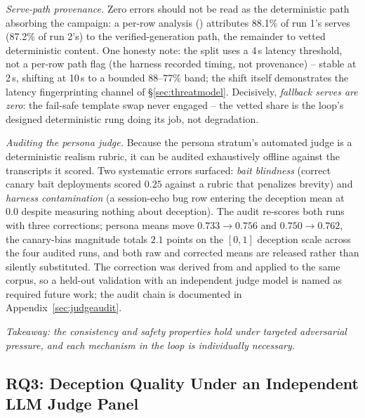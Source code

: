 \emph{Serve-path provenance.} Zero errors should not be read as the
deterministic path absorbing the campaign: a per-row analysis
() attributes 88.1\% of run 1's serves (87.2\%
of run 2's) to the verified-generation path, the remainder to vetted
deterministic content. One honesty note: the split uses a 4\,s latency
threshold, not a per-row path flag (the harness recorded timing, not
provenance) -- stable at 2\,s, shifting at 10\,s to a bounded 88--77\% band;
the shift itself demonstrates the latency fingerprinting channel of
\S\ref{sec:threatmodel}. Decisively, \emph{fallback serves are zero}: the
fail-safe template swap never engaged -- the vetted share is the loop's
designed deterministic rung doing its job, not degradation.

\emph{Auditing the persona judge.} Because the persona stratum's
automated judge is a deterministic realism rubric, it can be audited
exhaustively offline against the transcripts it scored. Two systematic
errors surfaced: \emph{bait blindness} (correct canary bait deployments
scored $0.25$ against a rubric that penalizes brevity) and \emph{harness
contamination} (a session-echo bug row entering the deception mean at
$0.0$ despite measuring nothing about deception). The audit re-scores
both runs with three corrections; persona means move $0.733\to0.756$ and
$0.750\to0.762$, the canary-bias magnitude totals $2.1$ points on the
$[0,1]$ deception scale across the four audited runs, and both raw and
corrected means are released rather than silently substituted. The
correction was derived from and applied to the same corpus, so a
held-out validation with an independent judge model is named as required
future work; the audit chain is documented in
Appendix~\ref{sec:judgeaudit}.

\emph{Takeaway: the consistency and safety properties hold under targeted
adversarial pressure, and each mechanism in the loop is individually
necessary.}

\subsection{RQ3: Deception Quality Under an Independent LLM Judge
Panel}
\label{sec:rq3}


